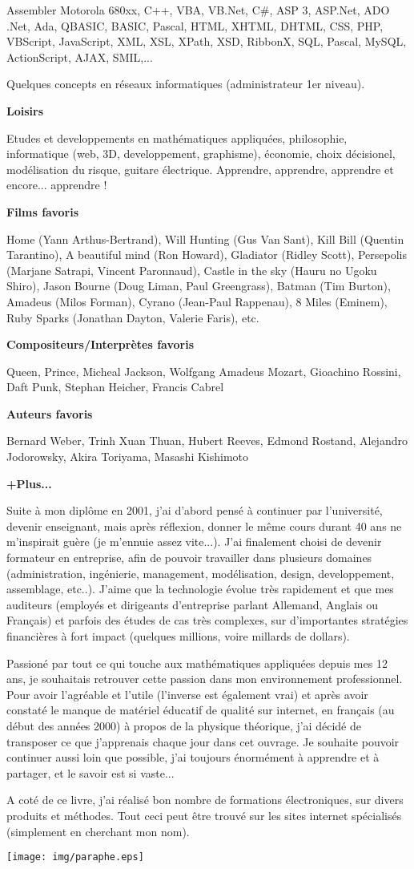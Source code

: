 Assembler Motorola 680xx, C++, VBA, VB.Net, C\#, ASP 3, ASP.Net, ADO .Net, Ada, QBASIC, BASIC, Pascal, HTML, XHTML, DHTML, CSS, PHP, VBScript, JavaScript, XML, XSL, XPath, XSD, RibbonX, SQL, Pascal, MySQL, ActionScript, AJAX, SMIL,...

Quelques concepts en réseaux informatiques (administrateur 1er niveau).

\textbf{Loisirs}

Etudes et developpements en mathématiques appliquées, philosophie, informatique (web, 3D, developpement, graphisme), économie, choix décisionel, modélisation du risque, guitare électrique. Apprendre, apprendre, apprendre et encore... apprendre !

\textbf{Films favoris}

Home (Yann Arthus-Bertrand), Will Hunting (Gus Van Sant), Kill Bill (Quentin Tarantino), A beautiful mind (Ron Howard), Gladiator (Ridley Scott), Persepolis (Marjane Satrapi, Vincent Paronnaud), Castle in the sky (Hauru no Ugoku Shiro), Jason Bourne (Doug Liman, Paul Greengrass), Batman (Tim Burton), Amadeus (Milos Forman), Cyrano (Jean-Paul Rappenau), 8 Miles (Eminem), Ruby Sparks (Jonathan Dayton, Valerie Faris), etc.

\textbf{Compositeurs/Interprètes favoris}

Queen, Prince, Micheal Jackson, Wolfgang Amadeus Mozart, Gioachino Rossini, Daft Punk, Stephan Heicher, Francis Cabrel

\textbf{Auteurs favoris}

Bernard Weber, Trinh Xuan Thuan, Hubert Reeves, Edmond Rostand, Alejandro Jodorowsky, Akira Toriyama, Masashi Kishimoto

\textbf{+Plus...}

	Suite à mon diplôme en 2001, j'ai d'abord pensé à continuer par l'université, devenir enseignant, mais après réflexion, donner le même cours durant 40 ans ne m'inspirait guère (je m'ennuie assez vite...). J'ai finalement choisi de devenir formateur en entreprise, afin de pouvoir travailler dans plusieurs domaines (administration, ingénierie, management, modélisation, design, developpement, assemblage, etc..). J'aime que la technologie évolue très rapidement et que mes auditeurs (employés et dirigeants d'entreprise parlant Allemand, Anglais ou Français) et parfois des études de cas très complexes, sur d'importantes stratégies financières à fort impact (quelques millions, voire millards de dollars).

	Passioné par tout ce qui touche aux mathématiques appliquées depuis mes 12 ans, je souhaitais retrouver cette passion dans mon environnement professionnel. Pour avoir l'agréable et l'utile (l'inverse est également vrai) et après avoir constaté le manque de matériel éducatif de qualité sur internet, en français (au début des années 2000) à propos de la physique théorique, j'ai décidé de transposer ce que j'apprenais chaque jour dans cet ouvrage. Je souhaite pouvoir continuer aussi loin que possible, j'ai toujours énormément à apprendre et à partager, et le savoir est si vaste...

A coté de ce livre, j'ai réalisé bon nombre de formations électroniques, sur divers produits et méthodes. Tout ceci peut être trouvé sur les sites internet spécialisés (simplement en cherchant mon nom).
\begin{flushright}
\texttt{[image: img/paraphe.eps]}
\end{flushright}
